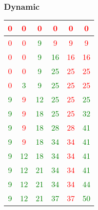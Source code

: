 \documentclass[12]{beamer}
\begin{document}
\begin{frame}
\frametitle{Dynamic}

\begin{center}
\begin{adjustbox}{max width=\textwidth}
\small
\begin{tabular}{ |c|c|c|c|c|c|}
\hline
 \textcolor{red}{0} & \textcolor{red}{0} & \textcolor{red}{0} & \textcolor{red}{0} & \textcolor{red}{0} & \textcolor{red}{0}\\ 
\hline
 \textcolor{red}{0} & \textcolor{red}{0} & \textcolor{green}{9} & \textcolor{red}{9} & \textcolor{red}{9} & \textcolor{red}{9}\\ 
\hline
 \textcolor{red}{0} & \textcolor{red}{0} & \textcolor{green}{9} & \textcolor{green}{16} & \textcolor{red}{16} & \textcolor{red}{16}\\ 
\hline
 \textcolor{red}{0} & \textcolor{red}{0} & \textcolor{green}{9} & \textcolor{green}{25} & \textcolor{red}{25} & \textcolor{red}{25}\\ 
\hline
 \textcolor{red}{0} & \textcolor{green}{3} & \textcolor{green}{9} & \textcolor{green}{25} & \textcolor{red}{25} & \textcolor{red}{25}\\ 
\hline
 \textcolor{green}{9} & \textcolor{red}{9} & \textcolor{green}{12} & \textcolor{green}{25} & \textcolor{red}{25} & \textcolor{green}{25}\\ 
\hline
 \textcolor{green}{9} & \textcolor{red}{9} & \textcolor{green}{18} & \textcolor{green}{25} & \textcolor{red}{25} & \textcolor{green}{32}\\ 
\hline
 \textcolor{green}{9} & \textcolor{red}{9} & \textcolor{green}{18} & \textcolor{green}{28} & \textcolor{red}{28} & \textcolor{green}{41}\\ 
\hline
 \textcolor{green}{9} & \textcolor{red}{9} & \textcolor{green}{18} & \textcolor{green}{34} & \textcolor{red}{34} & \textcolor{green}{41}\\ 
\hline
 \textcolor{green}{9} & \textcolor{green}{12} & \textcolor{green}{18} & \textcolor{green}{34} & \textcolor{red}{34} & \textcolor{green}{41}\\ 
\hline
 \textcolor{green}{9} & \textcolor{green}{12} & \textcolor{green}{21} & \textcolor{green}{34} & \textcolor{red}{34} & \textcolor{green}{41}\\ 
\hline
 \textcolor{green}{9} & \textcolor{green}{12} & \textcolor{green}{21} & \textcolor{green}{34} & \textcolor{red}{34} & \textcolor{green}{44}\\ 
\hline
 \textcolor{green}{9} & \textcolor{green}{12} & \textcolor{green}{21} & \textcolor{green}{37} & \textcolor{red}{37} & \textcolor{green}{50}\\ 

\end{tabular}
\end{adjustbox}
\end{center}
\end{frame}
\end{document}
